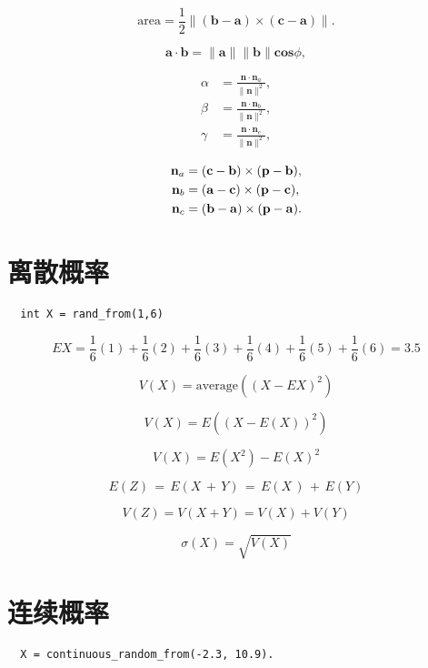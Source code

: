 \documentclass[lang=cn,12pt,marginpar=margintrue]{elegantbook}
\begin{document}
\begin{equation}
  \mathrm{area}={\frac{1}{2}}\|(\mathbf{b}-\mathbf{a})\times(\mathbf{c}-\mathbf{a})\|.
\end{equation}

\[
  \mathbf{a \cdot b}=\|\mathbf{a}\|\|\mathbf{b}\|\mathbf{cos}\phi,
\]

\[
  \begin{aligned}
    \alpha & ={\frac{\mathbf{n}\cdot\mathbf{n}_a}{\|\mathbf{n}\|^{2}}}, \\
    \beta  & ={\frac{\mathbf{n}\cdot\mathbf{n}_b}{\|\mathbf{n}\|^{2}}}, \\
    \gamma & ={\frac{\mathbf{n}\cdot\mathbf{n}_c}{\|\mathbf{n}\|^{2}}},
  \end{aligned}
\]

\begin{equation}
  \begin{aligned}
    {\bf n}_{a} & =({\bf c}-{\bf b})\times({\bf p}-{\bf b}), \\
    {\bf n}_{b} & =({\bf a}-{\bf c})\times({\bf p}-{\bf c}), \\
    {\bf n}_{c} & =({\bf b}-{\bf a})\times({\bf p}-{\bf a}).
  \end{aligned}
\end{equation}

\section{离散概率}

\begin{lstlisting}
  int X = rand_from(1,6)
\end{lstlisting}

\[
  E X=\frac{1}{6}(1)+\frac{1}{6}(2)+\frac{1}{6}(3)+\frac{1}{6}(4)+\frac{1}{6}(5)+\frac{1}{6}(6)=3.5
\]

\[
  V(X)={\mathrm{average}}((X-EX)^{2})
\]

\[
  V(X)=E((X-E(X))^{2})
\]

\[
  V(X)=E(X^{2})-E(X)^{2}
\]

\[
  E(Z)\,=\,E(X\,+\,Y)\,=\,E(X\,)\,+\,E(Y)
\]

\[
  V(Z)=V(X+Y)=V(X)+V(Y)
\]

\[
  \sigma(X)=\sqrt{V(X)}
\]

\section{连续概率}

\begin{lstlisting}
  X = continuous_random_from(-2.3, 10.9).
\end{lstlisting}
\end{document}
